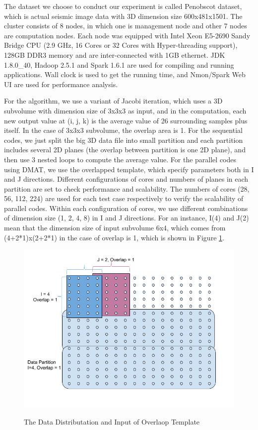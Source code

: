 The dataset we choose to conduct our experiment is called Penobscot dataset, which is actual seismic image data with 3D dimension size 600x481x1501. 
The cluster consists of 8 nodes, in which one is management node and other 7 nodes are computation nodes. Each node was equipped with Intel Xeon E5-2690 Sandy Bridge CPU (2.9 GHz, 16 Cores or 32 Cores with Hyper-threading support), 128GB DDR3 memory and are inter-connected with 1GB ethernet. 
JDK 1.8.0\_40, Hadoop 2.5.1 and Spark 1.6.1 are used for compiling and running applications. Wall clock is used to get the running time, and Nmon/Spark Web UI are used for performance analysis.

For the algorithm, we use a variant of Jacobi iteration, which uses a 3D subvolume with dimension size of 3x3x3 as input, and in the computation, each new output value at (i, j, k) is the average value of 26 surrounding samples plus itself. In the case of 3x3x3 subvolume, the overlap area is 1. 
For the sequential codes, we just split the big 3D data file into small partition and each partition includes several 2D planes (the overlap between partition is one 2D plane), and then use 3 nested loops to compute the average value. 
For the parallel codes using DMAT, we use the overlapped template, which specify parameters both in I and J directions. 
Different configurations of cores and numbers of planes in each partition are set to check performance and scalability. 
The numbers of cores (28, 56, 112, 224) are used for each test case respectively to verify the scalability of parallel codes. 
Within each configuration of cores, we use different combinations of dimension size (1, 2, 4, 8) in I and J directions. For an instance, I(4) and J(2) mean that the dimension size of input subvolume 6x4, which comes from (4+2*1)x(2+2*1) in the case of overlap is 1, which is shown in Figure \ref{StencilData}.

\begin{figure}[h]
\centering
\includegraphics[scale=0.7]{figures/StencilData.png}\\
\caption{The Data Distributation and Input of Overlaop Template}
\label{StencilData}
\end{figure}

